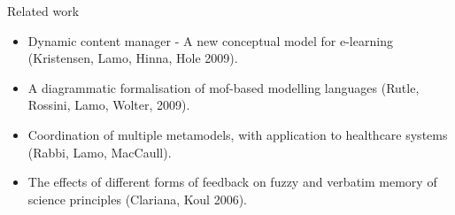 \documentclass{beamer}
\begin{document}
\begin{frame}{Related work}
\begin{itemize}
	\item Dynamic content manager - A new conceptual model for e-learning (Kristensen, Lamo, Hinna, Hole 2009).
	\item A	diagrammatic formalisation of mof-based modelling languages (Rutle, Rossini, Lamo, Wolter, 2009).
	\item Coordination of multiple metamodels, with application to healthcare systems (Rabbi, Lamo, MacCaull).
	\item The effects of different forms of	feedback on fuzzy and verbatim memory of science principles (Clariana, Koul 2006).
\end{itemize}
\end{frame}
\end{document}
